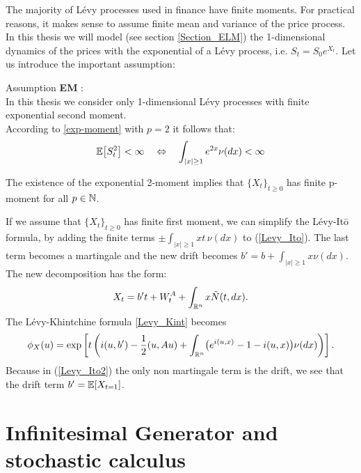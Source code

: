 The majority of Lévy processes used in finance have finite moments.
For practical reasons, it makes sense to assume finite mean and variance of the price process.
In this thesis we will model (see section \ref{Section_ELM}) the 1-dimensional dynamics of the prices with the exponential of a Lévy process, 
i.e. $S_t = S_0 e^{X_t}$. Let us introduce the important assumption:  
\begin{center}
\begin{riquadro}{12cm}
Assumption \textbf{EM}\label{AssumptionEM}  :\\
In this thesis we consider only 1-dimensional Lévy processes with finite exponential second moment.\\
According to \ref{exp-moment} with $p=2$ it follows that:
$$ \mathbb{E}\bigl[ S_t^2 \bigr] < \infty \quad \Leftrightarrow  \quad \int_{|x| \geq 1} e^{2x} \nu(dx) <\infty $$
\end{riquadro}
\end{center}

The existence of the exponential 2-moment implies that $\{X_t\}_{t \geq 0}$ has finite p-moment for all $p \in \mathbb{N}$.


\vspace{1.5em}

If we assume that $\{X_t\}_{t \geq 0}$ has finite first moment, we can simplify the Lévy-It\={o} formula, by adding the finite terms $\pm \int_{|x| \geq 1} x t\, \nu(dx)$ 
to (\ref{Levy_Ito}). The last term becomes a martingale and the new drift becomes $b' = b+\int_{|x| \geq 1} x \nu(dx)$.\\
The new decomposition has the form:
\begin{equation}\label{Levy_Ito2}
 X_t = b't + W^A_t + \int_{\mathbb{R}^n} x \tilde{N}(t,dx).
\end{equation}
The Lévy-Khintchine formula \ref{Levy_Kint} becomes
\begin{equation}\label{Levy_Kint2}
\phi_X(u) = \mbox{exp} \left[ t \left( i(u,b') - \frac{1}{2}(u,Au) + \int_{\mathbb{R}^n} 
	   \bigl( e^{i(u,x)} -1 -i(u,x) \bigr) \nu(dx) \right) \right]. 
\end{equation}
Because in (\ref{Levy_Ito2}) the only non martingale term is the drift, we see that the drift term $b' = \mathbb{E}[ X_{t=1} ]$.


\section{Infinitesimal Generator and stochastic calculus}\label{Infinitesimal_generator_stoch_calc}

